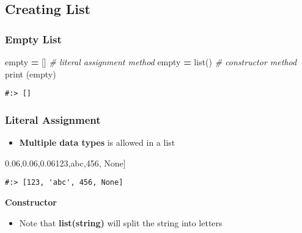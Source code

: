 \documentclass[
]{book}
\newenvironment{Shaded}{\begin{snugshade}}{\end{snugshade}}
\newcommand{\BuiltInTok}[1]{#1}
\newcommand{\CommentTok}[1]{\textcolor[rgb]{0.37,0.37,0.37}{\textit{#1}}}
\newcommand{\DecValTok}[1]{\textcolor[rgb]{0.06,0.06,0.06}{#1}}
\newcommand{\NormalTok}[1]{#1}
\newcommand{\OperatorTok}[1]{\textcolor[rgb]{0.43,0.43,0.43}{\textbf{#1}}}
\newcommand{\StringTok}[1]{\textcolor[rgb]{0.5,0.5,0.5}{#1}}
\newcommand{\VariableTok}[1]{\textcolor[rgb]{0,0,0}{#1}}
\providecommand{\tightlist}{%
  \setlength{\itemsep}{0pt}\setlength{\parskip}{0pt}}
\begin{document}
\hypertarget{creating-list}{%
\subsection{Creating List}\label{creating-list}}

\hypertarget{empty-list}{%
\subsubsection{Empty List}\label{empty-list}}

\begin{Shaded}
\begin{Highlighting}[]
\NormalTok{empty }\OperatorTok{=}\NormalTok{ []      }\CommentTok{\# literal assignment method}
\NormalTok{empty }\OperatorTok{=} \BuiltInTok{list}\NormalTok{()  }\CommentTok{\# constructor method}
\BuiltInTok{print}\NormalTok{ (empty)}
\end{Highlighting}
\end{Shaded}

\begin{verbatim}
#:> []
\end{verbatim}

\hypertarget{literal-assignment}{%
\subsubsection{Literal Assignment}\label{literal-assignment}}

\begin{itemize}
\tightlist
\item
  \textbf{Multiple data types} is allowed in a list
\end{itemize}

\begin{Shaded}
\begin{Highlighting}[]
\NormalTok{[}\DecValTok{123}\NormalTok{,}\StringTok{\textquotesingle{}abc\textquotesingle{}}\NormalTok{,}\DecValTok{456}\NormalTok{, }\VariableTok{None}\NormalTok{]}
\end{Highlighting}
\end{Shaded}

\begin{verbatim}
#:> [123, 'abc', 456, None]
\end{verbatim}

\textbf{Constructor}

\begin{itemize}
\tightlist
\item
  Note that \textbf{list(string)} will split the string into letters
\end{itemize}
\end{document}

